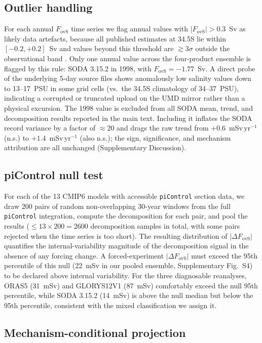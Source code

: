 \documentclass[12pt,a4paper]{article}
\newcommand{\Fovs}{F_\mathrm{ovS}}
\begin{document}
\subsection*{Outlier handling}

For each annual $\Fovs$ time series we flag annual values with
$|\Fovs| > 0.3$~Sv as likely data artefacts, because all
published estimates at 34.5\textdegree S lie within $[-0.2, +0.2]$~Sv
and values beyond this threshold are ${\gtrsim}3\sigma$ outside the
observational band \citep{Weijer2019}. Only one annual value across
the four-product ensemble is flagged by this rule: SODA 3.15.2 in
1998, with $\Fovs = -1.77$~Sv. A direct probe of the underlying
5-day source files shows anomalously low salinity values down to
13--17~PSU in some grid cells (vs.\ the 34.5\textdegree S
climatology of 34--37~PSU), indicating a corrupted or truncated
upload on the UMD mirror rather than a physical excursion. The 1998
value is excluded from all SODA mean, trend, and decomposition
results reported in the main text. Including it inflates the SODA
record variance by a factor of $\approx 20$ and drags the raw trend
from $+0.6$~mSv\,yr$^{-1}$ (n.s.) to $+1.4$~mSv\,yr$^{-1}$ (also
n.s.); the sign, significance, and mechanism attribution are all
unchanged (Supplementary Discussion).

\subsection*{piControl null test}

For each of the 13 CMIP6 models with accessible \texttt{piControl}
section data, we draw 200 pairs of random non-overlapping 30-year
windows from the full \texttt{piControl} integration, compute the
decomposition for each pair, and pool the results (${\le}13\times
200 = 2600$ decomposition samples in total, with some pairs
rejected when the time series is too short). The resulting
distribution of $|\Delta\Fovs|$ quantifies the internal-variability
magnitude of the decomposition signal in the absence of any forcing
change. A forced-experiment $|\Delta\Fovs|$ must exceed the 95th
percentile of this null (22~mSv in our pooled ensemble,
Supplementary Fig.~S4) to be declared above internal variability.
For the three diagnosable reanalyses, ORAS5 (31~mSv) and GLORYS12V1
(87~mSv) comfortably exceed the null 95th percentile, while SODA
3.15.2 (14~mSv) is above the null median but below the 95th
percentile, consistent with the mixed classification we assign it.

\subsection*{Mechanism-conditional projection}
\end{document}
